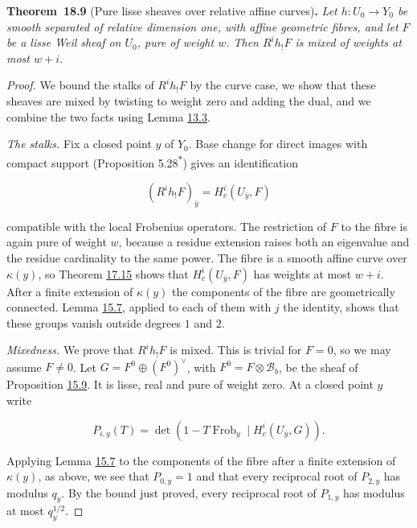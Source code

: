\documentclass[11pt]{article}
\newenvironment{bpstatement}[2]{\par\addvspace{0.6\baselineskip}\noindent\textbf{#1}#2\textbf{.}\enspace\ignorespaces}
  {\par\addvspace{0.4\baselineskip}}
\newenvironment{bpstatementit}[2]{\begin{bpstatement}{#1}{#2}\itshape\ignorespaces}{\end{bpstatement}}
\newcommand{\bpout}[1]{#1\textsuperscript{\hyperlink{bp-outside}{\ensuremath{\ast}}}}
\begin{document}
\label{bp299}%
\begin{bpstatementit}{Theorem~18.9}{ (Pure lisse sheaves over relative affine curves)}
Let \(h:U_0\to Y_0\) be smooth separated of relative dimension one, with affine geometric fibres, and let \(F\) be a lisse Weil sheaf on \(U_0\), pure of weight \(w\). Then \(R^ih_!F\) is mixed of weights at most \(w+i\).
\end{bpstatementit}

\begin{proof}[{Proof}]\label{bp300}%
We bound the stalks of \(R^ih_!F\) by the curve case, we show that these sheaves are mixed by twisting to weight zero and adding the dual, and we combine the two facts using Lemma \hyperref[bp14]{13.3}.

\emph{The stalks.} Fix a closed point \(y\) of \(Y_0\). Base change for direct images with compact support (Proposition \bpout{5.28}) gives an identification

\[
(R^ih_!F)_{\bar y}=H_c^i(U_{\bar y},F)
\]

compatible with the local Frobenius operators. The restriction of \(F\) to the fibre is again pure of weight \(w\), because a residue extension raises both an eigenvalue and the residue cardinality to the same power. The fibre is a smooth affine curve over \(\kappa(y)\), so Theorem \hyperref[bp269]{17.15} shows that \(H_c^i(U_{\bar y},F)\) has weights at most \(w+i\). After a finite extension of \(\kappa(y)\) the components of the fibre are geometrically connected. Lemma \hyperref[bp140]{15.7}, applied to each of them with \(j\) the identity, shows that these groups vanish outside degrees \(1\) and \(2\).

\emph{Mixedness.} We prove that \(R^ih_!F\) is mixed. This is trivial for \(F=0\), so we may assume \(F\ne0\). Let \(G=F^0\oplus(F^0)^\vee\), with \(F^0=F\otimes\mathcal B_b\), be the sheaf of Proposition \hyperref[bp148]{15.9}. It is lisse, real and pure of weight zero. At a closed point \(y\) write

\[
P_{i,y}(T)=\det(1-T\operatorname{Frob}_y\mid H_c^i(U_{\bar y},G)).
\]

Applying Lemma \hyperref[bp140]{15.7} to the components of the fibre after a finite extension of \(\kappa(y)\), as above, we see that \(P_{0,y}=1\) and that every reciprocal root of \(P_{2,y}\) has modulus \(q_y\). By the bound just proved, every reciprocal root of \(P_{1,y}\) has modulus at most \(q_y^{1/2}\).


\end{proof}
\end{document}
